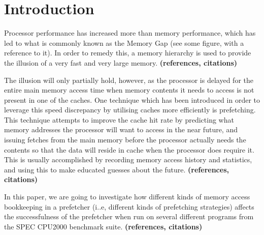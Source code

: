 
\section{Introduction}
\label{sec:introduction}

Processor performance has increased more than memory performance,
which has led to what is commonly known as the Memory Gap (see some
figure, with a reference to it). In order to remedy this, a memory
hierarchy is used to provide the illusion of a very fast and very
large memory. 
{\bf (references, citations)}

The illusion will only partially hold, however, as the processor is
delayed for the entire main memory access time when memory contents it
needs to access is not present in one of the caches. One technique
which has been introduced in order to leverage this speed discrepancy
by utilising caches more efficiently is prefetching. This technique
attempts to improve the cache hit rate by predicting what memory
addresses the processor will want to access in the near future, and
issuing fetches from the main memory before the processor actually
needs the contents so that the data will reside in cache when the
processor does require it. This is usually accomplished by recording
memory access history and statistics, and using this to make educated
guesses about the future. 
{\bf (references, citations)}

In this paper, we are going to investigate how different kinds of
memory access bookkeeping in a prefetcher (i..e, different kinds of
prefetching strategies) affects the successfulness of the prefetcher
when run on several different programs from the SPEC CPU2000 benchmark
suite.
{\bf (references, citations)}
